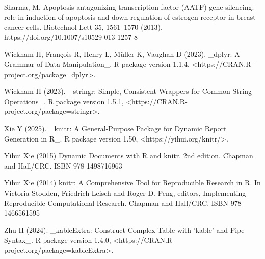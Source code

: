 \documentclass{article}
\begin{document}
Sharma, M. Apoptosis-antagonizing transcription factor (AATF) gene silencing: role in induction of apoptosis and down-regulation of estrogen receptor in breast cancer cells. Biotechnol Lett 35, 1561–1570 (2013). https://doi.org/10.1007/s10529-013-1257-8

Wickham H, François R, Henry L, Müller K, Vaughan D (2023). _dplyr: A
  Grammar of Data Manipulation_. R package version 1.1.4,
  <https://CRAN.R-project.org/package=dplyr>.

Wickham H (2023). _stringr: Simple, Consistent Wrappers for Common String
  Operations_. R package version 1.5.1,
  <https://CRAN.R-project.org/package=stringr>.

Xie Y (2025). _knitr: A General-Purpose Package for Dynamic Report
  Generation in R_. R package version 1.50, <https://yihui.org/knitr/>.

Yihui Xie (2015) Dynamic Documents with R and knitr. 2nd edition. Chapman
  and Hall/CRC. ISBN 978-1498716963

Yihui Xie (2014) knitr: A Comprehensive Tool for Reproducible Research in
  R. In Victoria Stodden, Friedrich Leisch and Roger D. Peng, editors,
  Implementing Reproducible Computational Research. Chapman and Hall/CRC.
  ISBN 978-1466561595

Zhu H (2024). _kableExtra: Construct Complex Table with 'kable' and Pipe
  Syntax_. R package version 1.4.0,
  <https://CRAN.R-project.org/package=kableExtra>.
  
\end{document}
